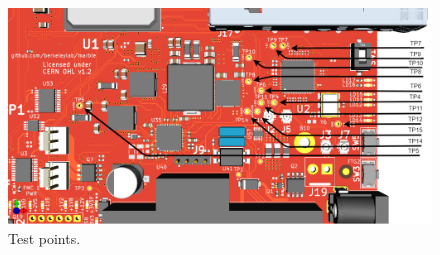 \documentclass[12pt,oneside,a4]{article}
\begin{document}
\begin{figure}[H]
\begin{center}
\includegraphics[width=1\linewidth]{Marble_TP.png}
 \caption{Test points. }\label{tp}
\end{center}
\end{figure}
\end{document}
